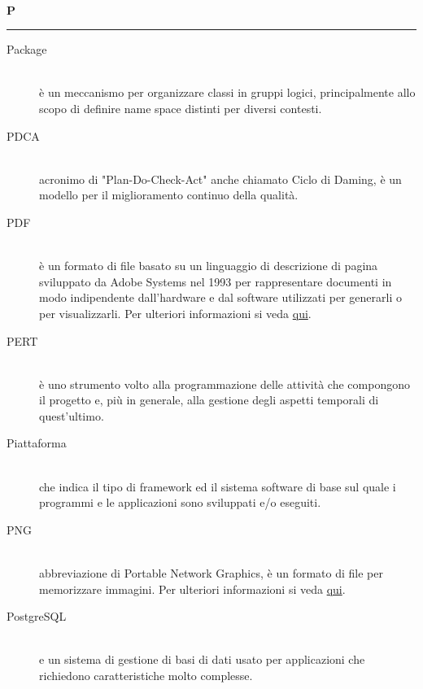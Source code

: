 \documentclass[12pt,a4paper]{article}
\begin{document}
\newpage

\begin{center}
\hfill\\
	\LARGE \textbf{P}
\hfill\\
\rule[15pt]{30pt}{0.5pt}
\end{center}

\begin{description}
\item[Package] 
\hfill\\è un meccanismo per organizzare classi  in gruppi logici, principalmente allo scopo di definire name space distinti per diversi contesti.

\item[PDCA] 
\hfill\\ acronimo di "Plan-Do-Check-Act" anche chiamato Ciclo di Daming, è un modello per il miglioramento continuo della qualità.

\item[PDF] 
\hfill\\ è un formato di file basato su un linguaggio di descrizione di pagina sviluppato da Adobe Systems nel 1993 per rappresentare documenti in modo indipendente dall’hardware e dal software utilizzati per generarli o per visualizzarli. Per ulteriori informazioni si veda \href{http://it.wikipedia.org/wiki/Portable_Document_Format}{qui}.

\item[PERT] 
\hfill\\ è uno strumento volto alla programmazione delle attività che compongono il progetto e, più in generale, alla gestione degli aspetti temporali di quest'ultimo.

\item[Piattaforma] 
\hfill\\ che indica il tipo di framework ed il sistema software di base sul quale i programmi e le applicazioni sono sviluppati e/o eseguiti.

\item[PNG] 
\hfill\\ abbreviazione di Portable Network Graphics, è un formato di file per memorizzare immagini. Per ulteriori informazioni si veda \href{http://it.wikipedia.org/wiki/Portable_Network_Graphics}{qui}.

\item[PostgreSQL] 
\hfill\\ e un sistema di gestione di basi di dati  usato per applicazioni che richiedono caratteristiche molto complesse.


\end{description}
\end{document}
